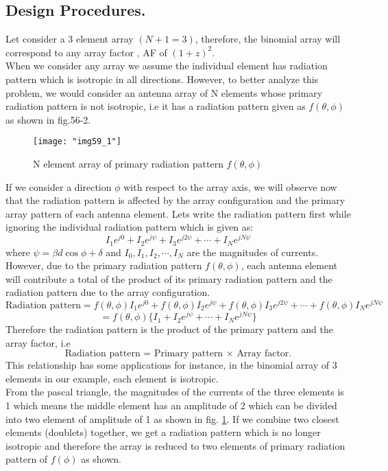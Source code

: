 	\subsection{Design Procedures.}
	Let consider a 3 element array $(N + 1 = 3)$, therefore, the binomial array will correspond to any array factor , AF of $(1 + z)^2$.\\
	When we consider any array we assume the individual element has radiation pattern which is isotropic in all directions. However, to better analyze this problem, we would consider an antenna array of N elements whose primary radiation pattern is not isotropic, i.e it has a radiation pattern given as $f(\theta,\phi)$ as shown in fig.56-2.
	
	\begin{figure}[H]
		\centering
		\texttt{[image: "img59\_1"]}
		\caption{N element array of primary radiation pattern $f(\theta, \phi)$}
		\label{fig:fig-2}
	\end{figure}
	If we consider a direction $\phi$ with respect to the array axis, we will observe now that the radiation pattern is affected by the array configuration and the primary array pattern of each antenna element. Lets write the radiation pattern first while ignoring the individual radiation pattern which is given as: 
	$$I_1 e^{j0} + I_2 e^{j\psi} + I_3 e^{j2\psi} + \cdots + I_N e^{jN\psi}$$
	where $\psi = \beta d\cos\phi + \delta$ and $I_0, I_1, I_2, \cdots, I_N$ are the magnitudes of currents. However, due to the primary radiation pattern $f(\theta, \phi)$, each antenna element will contribute a total of the product of its primary radiation pattern and the radiation pattern due to the array configuration.
	\begin{dmath*}
		\text{Radiation pattern} = f(\theta, \phi)I_1 e^{j0} + f(\theta, \phi)I_2 e^{j\psi} + f(\theta, \phi)I_3 e^{j2\psi} + \cdots + f(\theta, \phi)I_N e^{jN\psi} 
	\end{dmath*}
	$$= f(\theta, \phi)\{I_1 + I_2 e^{j\psi}  + \cdots + I_N e^{jN\psi}\}$$
	Therefore the radiation pattern is the product of the primary pattern and the array factor, i.e
	\begin{equation}
		\text{Radiation pattern = Primary pattern $\times$ Array factor.}
		\label{eqn53}
	\end{equation}
	This relationship has some applications for instance, in the binomial array of 3 elements in our example, each element is isotropic.\\
	From the pascal triangle, the magnitudes of the currents of the three elements is 1   which means the middle element has an amplitude of 2 which can be divided into two element of amplitude of 1 as shown in fig. \ref{fig:fig-2}. If we combine two closest elements (doublets) together, we get a radiation pattern which is no longer isotropic and therefore the array is reduced to two elements of primary radiation pattern of $f(\phi)$ as shown.\\

